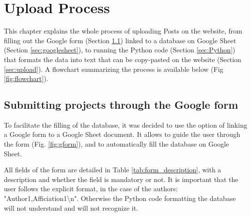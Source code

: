 \chapter{Upload Process}\label{chap:process}

This chapter explains the whole process of uploading Posts on the website, from filling out the Google form (Section \ref{sec:googleform}) linked to a database on Google Sheet (Section \ref{sec:googlesheet}), to running the Python code (Section \ref{sec:Python}) that formats the data into text that can be copy-pasted on the website (Section \ref{sec:upload}). A flowchart summarizing the process is available below (Fig \ref{fig:flowchart}).

\begin{landscape}
\end{landscape}

\section{Submitting projects through the Google form}\label{sec:googleform}

To facilitate the filling of the database, it was decided to use the option of linking a Google form to a Google Sheet document. It allows to guide the user through the form (Fig. \ref{fig:gform}), and to automatically fill the database on Google Sheet.

All fields of the form are detailed in Table \ref{tab:form_description}, with a description and whether the field is mandatory or not. It is important that the user follows the explicit format, in the case of the authors: "Author1,Afficiation1\textbackslash n". Otherwise the Python code formatting the database will not understand and will not recognize it. 

